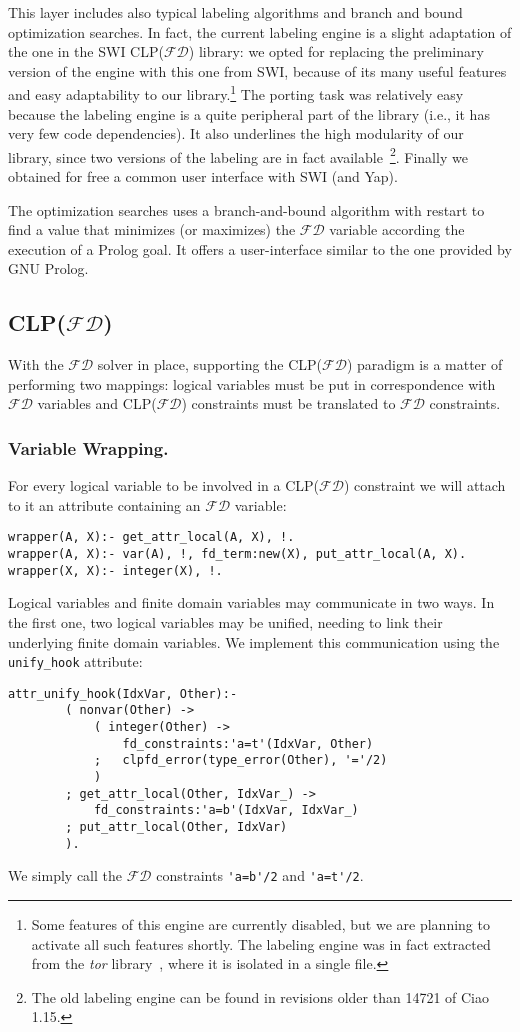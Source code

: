 \documentclass{llncs}
\newcommand{\clpfd}{CLP($\mathcal{FD}$)\xspace}
\newcommand{\fd}{$\mathcal{FD}$\xspace}
\begin{document}
This layer includes also typical labeling algorithms and branch and
bound optimization searches. In fact, the current labeling engine is a slight adaptation of the one
in the SWI \clpfd library: we opted for replacing the preliminary
version of the engine with this one from SWI, because of its many
useful features and easy adaptability to our library.\footnote{Some
  features of this engine are currently disabled, but we are planning
  to activate all such features shortly. The labeling engine was in
  fact extracted from the \emph{tor} library~\cite{tor2012}, where it
  is isolated in a single file.}
The porting task was relatively easy because the labeling engine is a
quite peripheral part of the library (i.e., it has very few code
dependencies).  It also underlines the high modularity of our library,
since two versions of the labeling are in fact available~\footnote{The
  old labeling engine can be found in revisions older than 14721 of
  Ciao 1.15.}.  Finally we obtained for free a common user interface
with SWI (and Yap).

The optimization searches uses a branch-and-bound algorithm with
restart to find a value that minimizes (or maximizes) the \fd
variable according the execution of a Prolog goal.  It offers a 
user-interface similar to the one provided by GNU Prolog.

\subsection{\clpfd}
With the \fd solver in place, supporting the \clpfd paradigm is a
matter of performing two mappings: logical variables must be put in 
correspondence with \fd variables and \clpfd constraints must be
translated to \fd constraints.

\subsubsection{Variable Wrapping.}

For every logical variable to be involved in a \clpfd constraint we
will attach to it an attribute containing an \fd variable:
\begin{lstlisting}
wrapper(A, X):-	get_attr_local(A, X), !.
wrapper(A, X):- var(A), !, fd_term:new(X), put_attr_local(A, X).
wrapper(X, X):- integer(X), !.
\end{lstlisting}
Logical variables and finite domain variables may communicate in two
ways. In the first one, two logical variables may be unified, needing
to link their underlying finite domain variables. We implement this
communication using the \verb!unify_hook! attribute:
\begin{lstlisting}
attr_unify_hook(IdxVar, Other):-
        ( nonvar(Other) ->
            ( integer(Other) ->
                fd_constraints:'a=t'(IdxVar, Other)
            ;   clpfd_error(type_error(Other), '='/2)
            )
        ; get_attr_local(Other, IdxVar_) ->
            fd_constraints:'a=b'(IdxVar, IdxVar_)
        ; put_attr_local(Other, IdxVar)
        ).
\end{lstlisting}
We simply call the \fd constraints \verb!'a=b'/2! and \verb!'a=t'/2!.
\end{document}
